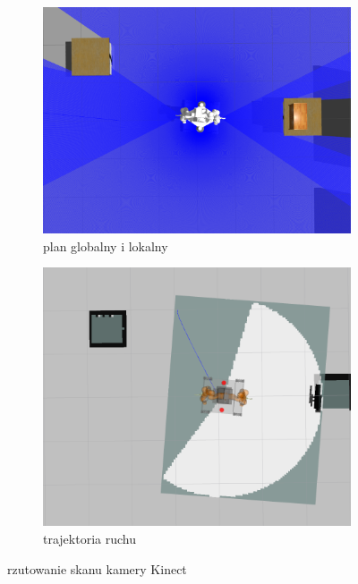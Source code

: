			
		\begin{figure}[h!]
 			 \centering
  			\begin{subfigure}[h]{\linewidth}
   				 \includegraphics[width=\linewidth]{imgs/wstepne_badania/gazebo_scan.png}
    				\caption{plan globalny i lokalny}
  			\end{subfigure}
  			\begin{subfigure}[h]{\linewidth}
    				\includegraphics[width=\linewidth]{imgs/wstepne_badania/rviz_scan.png}
   				 \caption{trajektoria ruchu}
  			\end{subfigure}
  			\caption{rzutowanie skanu kamery Kinect}
 			 \label{fig:scan}
		\end{figure}
	

